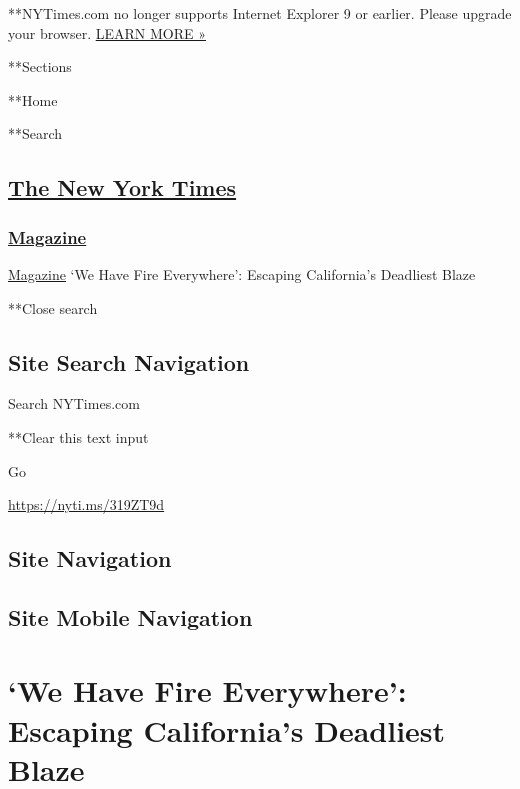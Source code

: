 **NYTimes.com no longer supports Internet Explorer 9 or earlier. Please
upgrade your browser.
\href{http://www.nytimes.com/content/help/site/ie9-support.html}{LEARN
MORE »}

**Sections

**Home

**Search

\hypertarget{the-new-york-times}{%
\subsection{\texorpdfstring{\href{http://www.nytimes.com/}{The New York
Times}}{The New York Times}}\label{the-new-york-times}}

\hypertarget{-magazine-}{%
\subsubsection{\texorpdfstring{
\href{https://www.nytimes.com/section/magazine}{Magazine}
}{ Magazine }}\label{-magazine-}}

 \href{https://www.nytimes.com/section/magazine}{Magazine} \textbar{}`We
Have Fire Everywhere': Escaping California's Deadliest Blaze

**Close search

\hypertarget{site-search-navigation}{%
\subsection{Site Search Navigation}\label{site-search-navigation}}

Search NYTimes.com

**Clear this text input

Go

\url{https://nyti.ms/319ZT9d}

\hypertarget{site-navigation}{%
\subsection{Site Navigation}\label{site-navigation}}

\hypertarget{site-mobile-navigation}{%
\subsection{Site Mobile Navigation}\label{site-mobile-navigation}}

\hypertarget{we-have-fire-everywhere-escaping-californias-deadliest-blaze}{%
\section{`We Have Fire Everywhere': Escaping California's Deadliest
Blaze}\label{we-have-fire-everywhere-escaping-californias-deadliest-blaze}}

